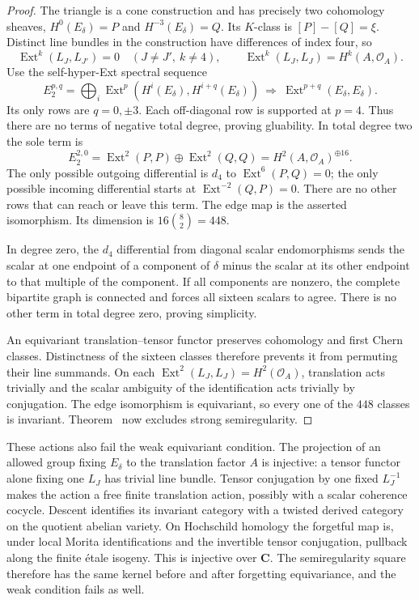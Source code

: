 \documentclass[11pt]{article}
\theoremstyle{definition}
\theoremstyle{remark}
\newcommand{\C}{\mathbf C}
\begin{document}
\begin{proof}
The triangle is a cone construction and has precisely two cohomology sheaves, $H^0(E_\delta)=P$ and $H^{-3}(E_\delta)=Q$. Its $K$-class is $[P]-[Q]=\xi$. Distinct line bundles in the construction have differences of index four, so
\[
 \operatorname{Ext}^k(L_J,L_{J'})=0\quad(J\ne J',\ k\ne4),
 \qquad\operatorname{Ext}^k(L_J,L_J)=H^k(A,\mathcal O_A).
\]
Use the self-hyper-Ext spectral sequence
\[
 E_2^{p,q}=\bigoplus_i
 \operatorname{Ext}^p(H^i(E_\delta),H^{i+q}(E_\delta))
 \ \Longrightarrow\ \operatorname{Ext}^{p+q}(E_\delta,E_\delta).
\]
Its only rows are $q=0,\pm3$. Each off-diagonal row is supported at $p=4$. Thus there are no terms of negative total degree, proving gluability. In total degree two the sole term is
\[
 E_2^{2,0}=\operatorname{Ext}^2(P,P)\oplus\operatorname{Ext}^2(Q,Q)
       =H^2(A,\mathcal O_A)^{\oplus16}.
\]
The only possible outgoing differential is $d_4$ to $\operatorname{Ext}^6(P,Q)=0$; the only possible incoming differential starts at $\operatorname{Ext}^{-2}(Q,P)=0$. There are no other rows that can reach or leave this term. The edge map is the asserted isomorphism. Its dimension is $16\binom82=448$.

In degree zero, the $d_4$ differential from diagonal scalar endomorphisms sends the scalar at one endpoint of a component of $\delta$ minus the scalar at its other endpoint to that multiple of the component. If all components are nonzero, the complete bipartite graph is connected and forces all sixteen scalars to agree. There is no other term in total degree zero, proving simplicity.

An equivariant translation--tensor functor preserves cohomology and first Chern classes. Distinctness of the sixteen classes therefore prevents it from permuting their line summands. On each $\operatorname{Ext}^2(L_J,L_J)=H^2(\mathcal O_A)$, translation acts trivially and the scalar ambiguity of the identification acts trivially by conjugation. The edge isomorphism is equivariant, so every one of the $448$ classes is invariant. Theorem~ now excludes strong semiregularity.
\end{proof}

These actions also fail the weak equivariant condition. The projection of an allowed group fixing $E_\delta$ to the translation factor $A$ is injective: a tensor functor alone fixing one $L_J$ has trivial line bundle. Tensor conjugation by one fixed $L_J^{-1}$ makes the action a free finite translation action, possibly with a scalar coherence cocycle. Descent identifies its invariant category with a twisted derived category on the quotient abelian variety. On Hochschild homology the forgetful map is, under local Morita identifications and the invertible tensor conjugation, pullback along the finite \'etale isogeny. This is injective over $\C$. The semiregularity square therefore has the same kernel before and after forgetting equivariance, and the weak condition fails as well.
\end{document}
